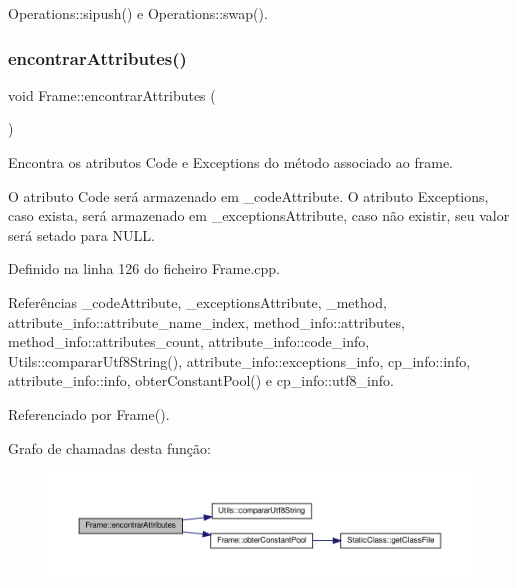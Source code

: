 Operations\+::sipush() e Operations\+::swap().

\mbox{\label{classFrame_a6950091ee708f622befdfcc7c35b7025}} 
\subsubsection{\texorpdfstring{encontrar\+Attributes()}{encontrarAttributes()}}
{\footnotesize\ttfamily void Frame\+::encontrar\+Attributes (\begin{DoxyParamCaption}{ }\end{DoxyParamCaption})\hspace{0.3cm}{\ttfamily [private]}}



Encontra os atributos Code e Exceptions do método associado ao frame. 

O atributo Code será armazenado em {\ttfamily \+\_\+code\+Attribute}. O atributo Exceptions, caso exista, será armazenado em {\ttfamily \+\_\+exceptions\+Attribute}, caso não existir, seu valor será setado para {\ttfamily N\+U\+LL}. 

Definido na linha 126 do ficheiro Frame.\+cpp.



Referências \+\_\+code\+Attribute, \+\_\+exceptions\+Attribute, \+\_\+method, attribute\+\_\+info\+::attribute\+\_\+name\+\_\+index, method\+\_\+info\+::attributes, method\+\_\+info\+::attributes\+\_\+count, attribute\+\_\+info\+::code\+\_\+info, Utils\+::comparar\+Utf8\+String(), attribute\+\_\+info\+::exceptions\+\_\+info, cp\+\_\+info\+::info, attribute\+\_\+info\+::info, obter\+Constant\+Pool() e cp\+\_\+info\+::utf8\+\_\+info.



Referenciado por Frame().

Grafo de chamadas desta função\+:
\nopagebreak
\begin{figure}[H]
\begin{center}
\leavevmode
\includegraphics[width=350pt]{classFrame_a6950091ee708f622befdfcc7c35b7025_cgraph}
\end{center}
\end{figure}
\mbox{\label{classFrame_a6863584ef3a6f2e4b1f93fb0deb09f4b}} 
